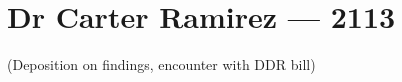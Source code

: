 \hypertarget{dr-carter-ramirez-2113}{%
\chapter*{Dr Carter Ramirez — 2113}\label{dr-carter-ramirez-2113}}

(Deposition on findings, encounter with DDR bill)
